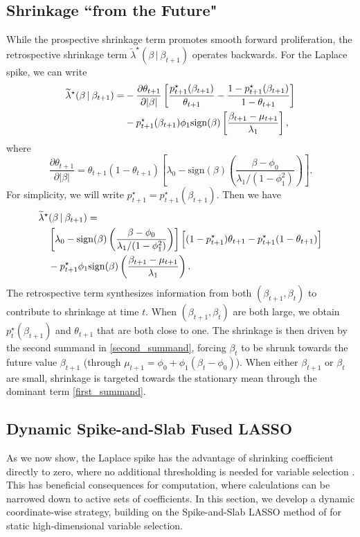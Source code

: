 \documentclass[ba]{imsart}
\numberwithin{equation}{section}
\theoremstyle{plain}
\def\C {\,|\:}
\def\C {\,|\:}
\begin{document}
\subsection{Shrinkage ``from the Future"}\label{sec:retro} While the prospective shrinkage term promotes smooth forward proliferation, the retrospective shrinkage term $\widetilde{\lambda}^\star(\beta\C\beta_{t+1})$ operates backwards.
For the Laplace spike,  we can write
 \begin{align}\label{shrinkage_future}
 \widetilde{\lambda}^\star(\beta\C\beta_{t+1})=&-\frac{\partial \theta_{t+1}}{\partial |\beta|}\left[\frac{p^\star_{t+1}(\beta_{t+1})}{\theta_{t+1}}-\frac{1-p^\star_{t+1}(\beta_{t+1})}{1-\theta_{t+1}}\right]\notag\\
 &-p^\star_{t+1}(\beta_{t+1})\phi_1\mathrm{sign}(\beta)\left[\frac{\beta_{t+1}-\mu_{t+1}}{\lambda_1}\right], 
\end{align}
where 
\begin{equation}\label{theta_der}
\frac{\partial\theta_{t+1}}{\partial|\beta|}=\theta_{t+1}(1-\theta_{t+1})\left[\lambda_0-\mathrm{sign}(\beta)\left(\frac{\beta-\phi_0}{\lambda_1/(1-\phi_1^2)}\right)\right].
\end{equation}
For simplicity, we will write $p^\star_{t+1}=p^\star_{t+1}(\beta_{t+1})$. Then we have
\begin{align}
& \widetilde{\lambda}^\star(\beta\C\beta_{t+1})=\notag\\
&\quad\left[\lambda_0-\mathrm{sign}(\beta)\left(\frac{\beta-\phi_0}{\lambda_1/(1-\phi_1^2)}\right)\right]\Big[
 (1-p^\star_{t+1})\theta_{t+1}-p^\star_{t+1}(1-\theta_{t+1})
  \Big]\label{first_summand}\\
  &\quad-p^\star_{t+1}\phi_1\mathrm{sign}(\beta)\left(\frac{\beta_{t+1}-\mu_{t+1}}{\lambda_1}\right).\label{second_summand}
  \end{align}
  The retrospective term  synthesizes information from both $(\beta_{t+1},\beta_t)$ to contribute to shrinkage at time $t$.
When $(\beta_{t+1},\beta_t)$ are both large, we obtain $p^\star_t(\beta_{t+1})$ and $\theta_{t+1}$ that are both close to one. The shrinkage  is then driven by the second summand in  \eqref{second_summand}, forcing $\beta_t$ to be shrunk towards the future value $\beta_{t+1}$ (through $\mu_{t+1}=\phi_0+\phi_1(\beta_t-\phi_0)$). When either $\beta_{t+1}$ or $\beta_t$ are small, shrinkage is  targeted towards the stationary mean through the dominant term \eqref{first_summand}.




\subsection{Dynamic Spike-and-Slab Fused LASSO}\label{sec:mode}
As we now show, the Laplace spike has the advantage of shrinking coefficient directly to zero, where no additional thresholding is needed for variable selection \citep{rockova15}. 
This has beneficial consequences for computation, where calculations can be narrowed down to active sets of coefficients. In this section, we develop a dynamic coordinate-wise strategy, building on the Spike-and-Slab LASSO method of \cite{SSL}   for static high-dimensional variable selection.
\end{document}
